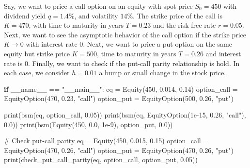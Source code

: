 \documentclass[
  letterpaper,
  DIV=11,
  numbers=noendperiod]{scrartcl}
\newenvironment{Shaded}{\begin{snugshade}}{\end{snugshade}}
\newcommand{\BuiltInTok}[1]{\textcolor[rgb]{0.00,0.23,0.31}{#1}}
\newcommand{\CommentTok}[1]{\textcolor[rgb]{0.37,0.37,0.37}{#1}}
\newcommand{\ControlFlowTok}[1]{\textcolor[rgb]{0.00,0.23,0.31}{\textbf{#1}}}
\newcommand{\DecValTok}[1]{\textcolor[rgb]{0.68,0.00,0.00}{#1}}
\newcommand{\FloatTok}[1]{\textcolor[rgb]{0.68,0.00,0.00}{#1}}
\newcommand{\NormalTok}[1]{\textcolor[rgb]{0.00,0.23,0.31}{#1}}
\newcommand{\OperatorTok}[1]{\textcolor[rgb]{0.37,0.37,0.37}{#1}}
\newcommand{\StringTok}[1]{\textcolor[rgb]{0.13,0.47,0.30}{#1}}
\newcommand{\VariableTok}[1]{\textcolor[rgb]{0.07,0.07,0.07}{#1}}
\begin{document}
Say, we want to price a call option on an equity with spot price
\(S_0 = 450\) with dividend yield \(q=1.4\%\), and volatility \(14\%\).
The strike price of the call is \(K=470\), with time to maturity in
years \(T=0.23\) and the risk free rate \(r = 0.05\). Next, we want to
see the asymptotic behavior of the call option if the strike price
\(K\rightarrow 0\) with interest rate 0. Next, we want to price a put
option on the same equity but strike price \(K=500\), time to maturity
in years \(T=0.26\) and interest rate is 0. Finally, we want to check if
the put-call parity relationship is hold. In each case, we consider
\(h=0.01\) a bump or small change in the stock price.

\begin{Shaded}
\begin{Highlighting}[]
\ControlFlowTok{if} \VariableTok{\_\_name\_\_} \OperatorTok{==} \StringTok{"\_\_main\_\_"}\NormalTok{:}
\NormalTok{    eq }\OperatorTok{=}\NormalTok{ Equity(}\DecValTok{450}\NormalTok{, }\FloatTok{0.014}\NormalTok{, }\FloatTok{0.14}\NormalTok{)}
\NormalTok{    option\_call }\OperatorTok{=}\NormalTok{ EquityOption(}\DecValTok{470}\NormalTok{, }\FloatTok{0.23}\NormalTok{, }\StringTok{"call"}\NormalTok{)}
\NormalTok{    option\_put }\OperatorTok{=}\NormalTok{ EquityOption(}\DecValTok{500}\NormalTok{, }\FloatTok{0.26}\NormalTok{, }\StringTok{"put"}\NormalTok{)}
    
    \BuiltInTok{print}\NormalTok{(bsm(eq, option\_call, }\FloatTok{0.05}\NormalTok{))  }
    \BuiltInTok{print}\NormalTok{(bsm(eq, EquityOption(}\FloatTok{1e{-}15}\NormalTok{, }\FloatTok{0.26}\NormalTok{, }\StringTok{"call"}\NormalTok{), }\FloatTok{0.0}\NormalTok{))  }
    \BuiltInTok{print}\NormalTok{(bsm(Equity(}\DecValTok{450}\NormalTok{, }\FloatTok{0.0}\NormalTok{, }\FloatTok{1e{-}9}\NormalTok{), option\_put, }\FloatTok{0.0}\NormalTok{))  }

    \CommentTok{\# Check put{-}call parity}
\NormalTok{    eq }\OperatorTok{=}\NormalTok{ Equity(}\DecValTok{450}\NormalTok{, }\FloatTok{0.015}\NormalTok{, }\FloatTok{0.15}\NormalTok{)}
\NormalTok{    option\_call }\OperatorTok{=}\NormalTok{ EquityOption(}\DecValTok{470}\NormalTok{, }\FloatTok{0.26}\NormalTok{, }\StringTok{"call"}\NormalTok{)}
\NormalTok{    option\_put }\OperatorTok{=}\NormalTok{ EquityOption(}\DecValTok{470}\NormalTok{, }\FloatTok{0.26}\NormalTok{, }\StringTok{"put"}\NormalTok{)}
    \BuiltInTok{print}\NormalTok{(check\_put\_call\_parity(eq, option\_call, option\_put, }\FloatTok{0.05}\NormalTok{)) }
\end{Highlighting}
\end{Shaded}
\end{document}
